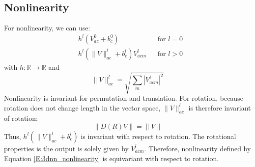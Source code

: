 \documentclass{IEEEtran}
\begin{document}
\subsection*{Nonlinearity}
For nonlinearity, we can use:
\begin{align*}
    &h^l (V_{ac}^0 + b_c^0) & &\text{for $l=0$} \\ 
    &h^l (\|V\|_{ac}^l + b_c^l)V_{acm}^{l} &  &\text{for $l>0$} \label{E:3dnn_nonlinearity}
\end{align*}
with $h\colon \mathbb{R}\to \mathbb{R}$ and 
\[ \|V\|_{ac}^l = \sqrt{\sum_m |V_{acm}^l|^2} \]
Nonlinearity is invariant for permutation and translation. For rotation, 
because rotation does not change length in the vector space, $\|V\|_{ac}^l$ is 
therefore invariant of rotation:
\begin{equation}
    \|D(R)V\| = \|V\|
\end{equation}
Thus, $h^l (\|V\|_{ac}^l + b_c^l)$ is invariant with respect to rotation. 
The rotational properties is the output is solely given by $V_{acm}^{l}$.
Therefore, nonlinearity defined by Equation \eqref{E:3dnn_nonlinearity} is equivariant
with respect to rotation.
\end{document}
